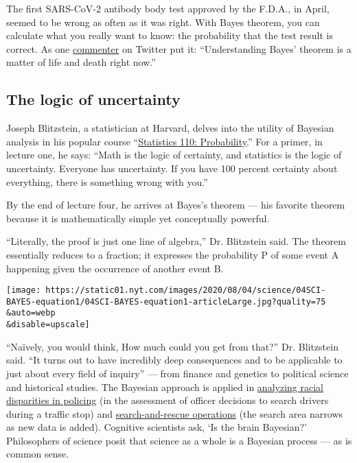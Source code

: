 The first SARS-CoV-2 antibody body test approved by the F.D.A., in
April, seemed to be wrong as often as it was right. With Bayes theorem,
you can calculate what you really want to know: the probability that the
test result is correct. As one
\href{https://twitter.com/Riderius/status/1246172832071135236}{commenter}
on Twitter put it: ``Understanding Bayes' theorem is a matter of life
and death right now.''

\hypertarget{the-logic-of-uncertainty}{%
\subsection{The logic of uncertainty}\label{the-logic-of-uncertainty}}

Joseph Blitzstein, a statistician at Harvard, delves into the utility of
Bayesian analysis in his popular course
``\href{https://www.youtube.com/playlist?list=PL2SOU6wwxB0uwwH80KTQ6ht66KWxbzTIo}{Statistics
110: Probability}.'' For a primer, in lecture one, he says: ``Math is
the logic of certainty, and statistics is the logic of uncertainty.
Everyone has uncertainty. If you have 100 percent certainty about
everything, there is something wrong with you.''

By the end of lecture four, he arrives at Bayes's theorem --- his
favorite theorem because it is mathematically simple yet conceptually
powerful.

``Literally, the proof is just one line of algebra,'' Dr. Blitzstein
said. The theorem essentially reduces to a fraction; it expresses the
probability P of some event A happening given the occurrence of another
event B.

\texttt{[image: https://static01.nyt.com/images/2020/08/04/science/04SCI-BAYES-equation1/04SCI-BAYES-equation1-articleLarge.jpg?quality=75\\\&auto=webp\\\&disable=upscale]}

``Naïvely, you would think, How much could you get from that?'' Dr.
Blitzstein said. ``It turns out to have incredibly deep consequences and
to be applicable to just about every field of inquiry'' --- from finance
and genetics to political science and historical studies. The Bayesian
approach is applied in
\href{https://www.nature.com/articles/s41562-020-0858-1}{analyzing
racial disparities in policing} (in the assessment of officer decisions
to search drivers during a traffic stop) and
\href{https://www.nytimes.com/2014/09/30/science/the-odds-continually-updated.html}{search-and-rescue
operations} (the search area narrows as new data is added). Cognitive
scientists ask, `Is the brain Bayesian?' Philosophers of science posit
that science as a whole is a Bayesian process --- as is common sense.

